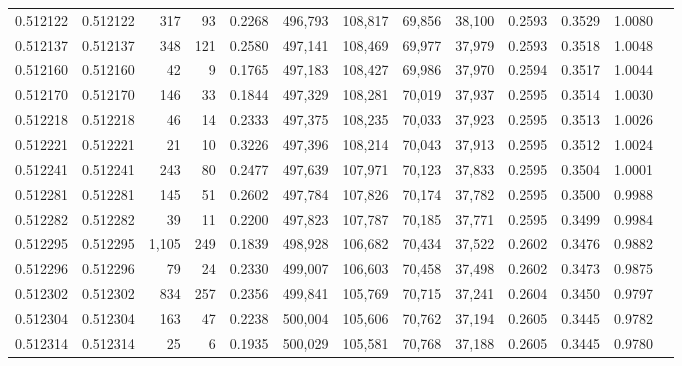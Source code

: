 \begin{tabular}{rrrrrrrrrrrrr}
0.512122 & 0.512122 &   317 &    93 &                                     0.2268 & 496,793 & 108,817 &  69,856 &  38,100 & 0.2593 & 0.3529 & 1.0080 \\
0.512137 & 0.512137 &   348 &   121 &                                     0.2580 & 497,141 & 108,469 &  69,977 &  37,979 & 0.2593 & 0.3518 & 1.0048 \\
0.512160 & 0.512160 &    42 &     9 &                                     0.1765 & 497,183 & 108,427 &  69,986 &  37,970 & 0.2594 & 0.3517 & 1.0044 \\
0.512170 & 0.512170 &   146 &    33 &                                     0.1844 & 497,329 & 108,281 &  70,019 &  37,937 & 0.2595 & 0.3514 & 1.0030 \\
0.512218 & 0.512218 &    46 &    14 &                                     0.2333 & 497,375 & 108,235 &  70,033 &  37,923 & 0.2595 & 0.3513 & 1.0026 \\
0.512221 & 0.512221 &    21 &    10 &                                     0.3226 & 497,396 & 108,214 &  70,043 &  37,913 & 0.2595 & 0.3512 & 1.0024 \\
0.512241 & 0.512241 &   243 &    80 &                                     0.2477 & 497,639 & 107,971 &  70,123 &  37,833 & 0.2595 & 0.3504 & 1.0001 \\
0.512281 & 0.512281 &   145 &    51 &                                     0.2602 & 497,784 & 107,826 &  70,174 &  37,782 & 0.2595 & 0.3500 & 0.9988 \\
0.512282 & 0.512282 &    39 &    11 &                                     0.2200 & 497,823 & 107,787 &  70,185 &  37,771 & 0.2595 & 0.3499 & 0.9984 \\
0.512295 & 0.512295 & 1,105 &   249 &                                     0.1839 & 498,928 & 106,682 &  70,434 &  37,522 & 0.2602 & 0.3476 & 0.9882 \\
0.512296 & 0.512296 &    79 &    24 &                                     0.2330 & 499,007 & 106,603 &  70,458 &  37,498 & 0.2602 & 0.3473 & 0.9875 \\
0.512302 & 0.512302 &   834 &   257 &                                     0.2356 & 499,841 & 105,769 &  70,715 &  37,241 & 0.2604 & 0.3450 & 0.9797 \\
0.512304 & 0.512304 &   163 &    47 &                                     0.2238 & 500,004 & 105,606 &  70,762 &  37,194 & 0.2605 & 0.3445 & 0.9782 \\
0.512314 & 0.512314 &    25 &     6 &                                     0.1935 & 500,029 & 105,581 &  70,768 &  37,188 & 0.2605 & 0.3445 & 0.9780 \\

\end{tabular}
